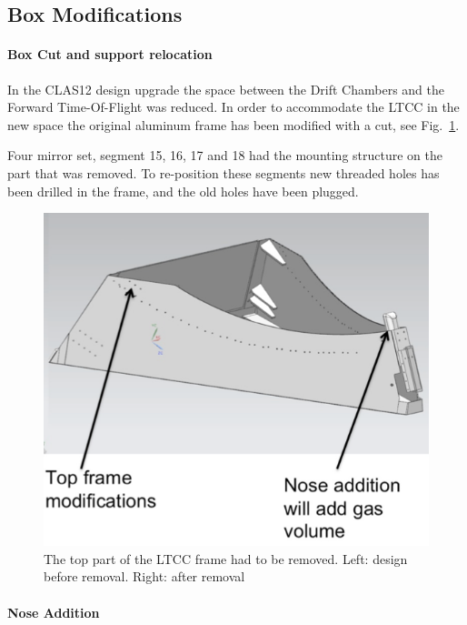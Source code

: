 \subsection{Box Modifications}



\paragraph{Box Cut and support relocation }

In the CLAS12 design upgrade the space between the Drift Chambers and the Forward Time-Of-Flight was reduced.
In order to accommodate the LTCC in the new space the original aluminum frame has been modified with a cut, see Fig.~\ref{fig:boxCut}.

Four mirror set, segment 15, 16, 17 and 18 had the mounting structure on the part that was removed.
To re-position these segments new threaded holes has been drilled in the frame, and the old holes have been plugged.

\begin{figure}[hbt]
	\centering
	\includegraphics[width=1.0\columnwidth,keepaspectratio]{img/boxCut.png}
	\caption{The top part of the LTCC frame had to be removed. Left: design before removal. Right: after removal}
	\label{fig:boxCut}
\end{figure}


\paragraph{Nose Addition}

